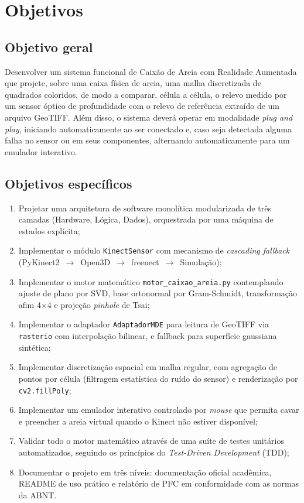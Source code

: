 \section{Objetivos}
\label{sec:objetivos}

\subsection{Objetivo geral}
\label{subsec:obj-geral}

Desenvolver um sistema funcional de Caixão de Areia com Realidade
Aumentada que projete, sobre uma caixa física de areia, uma
malha discretizada de quadrados coloridos, de modo a comparar, célula a 
célula, o relevo medido por um sensor óptico de profundidade com o relevo
de referência extraído de um arquivo GeoTIFF. Além disso, o sistema deverá
operar em modalidade \textit{plug and play}, iniciando automaticamente ao ser conectado
e, caso seja detectada alguma falha no sensor ou em seus componentes, alternando
automaticamente para um emulador interativo.

\subsection{Objetivos específicos}
\label{subsec:obj-especificos}

\begin{enumerate}
    \item Projetar uma arquitetura de software monolítica
          modularizada de três camadas (Hardware, Lógica, Dados),
          orquestrada por uma máquina de estados explícita;
    \item Implementar o módulo \texttt{KinectSensor} com mecanismo de
          \textit{cascading fallback} (PyKinect2~$\to$~Open3D~$\to$~freenect~$\to$~Simulação);
    \item Implementar o motor matemático \texttt{motor\_caixao\_areia.py}
          contemplando ajuste de plano por SVD, base ortonormal por
          Gram-Schmidt, transformação afim 4$\times$4 e projeção
          \textit{pinhole} de Tsai;
    \item Implementar o adaptador \texttt{AdaptadorMDE} para leitura de
          GeoTIFF via \texttt{rasterio} com interpolação bilinear, e
          fallback para superfície gaussiana sintética;
    \item Implementar discretização espacial em malha
          regular, com agregação de pontos por célula (filtragem
          estatística do ruído do sensor) e renderização por
          \texttt{cv2.fillPoly};
    \item Implementar um emulador interativo controlado por
          \textit{mouse} que permita cavar e preencher a areia virtual
          quando o Kinect não estiver disponível;
    \item Validar todo o motor matemático através de uma suíte de
          testes unitários automatizados, seguindo os
          princípios do \textit{Test-Driven Development} (TDD);
    \item Documentar o projeto em três níveis: documentação oficial
          acadêmica, README de uso prático e relatório de PFC
          em conformidade com as normas da ABNT.
\end{enumerate}

